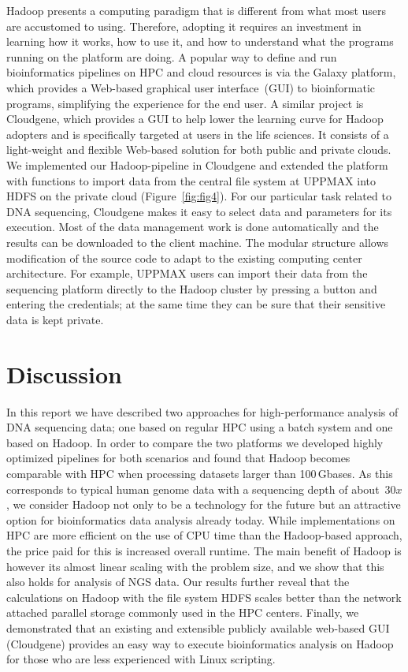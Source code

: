 \documentclass{bioinfo}
\begin{document}
Hadoop presents a computing paradigm that is different from what most users are
accustomed to using.  Therefore, adopting it requires an investment in learning
how it works, how to use it, and how to understand what the programs running on
the platform are doing.
A popular way to define and run bioinformatics pipelines on HPC and cloud resources
is via the Galaxy\citep{galaxy,Afgan:2010uq} platform, which provides a Web-based graphical
user interface~(GUI) to bioinformatic programs, simplifying the experience for
the end user.
A similar project is Cloudgene\citep{cloudgene}, which provides a GUI to help lower the learning curve
for Hadoop adopters and is specifically targeted at users in the life
sciences. It consists of a light-weight and flexible Web-based solution for both
public and private clouds. We implemented our Hadoop-pipeline in Cloudgene and
extended the platform with functions to import data from the central file system
at UPPMAX into HDFS on the private cloud (Figure~\ref{fig:fig4}).  For our
particular task related to DNA sequencing, Cloudgene makes it easy to select
data and parameters for its execution. Most of the data management work is done
automatically and the results can be downloaded to the client machine. The
modular structure allows modification of the source code to adapt to the
existing computing center architecture. For example, UPPMAX users can import
their data from the sequencing platform directly to the Hadoop cluster by
pressing a button and entering the credentials; at the same time they can be
sure that their sensitive data is kept private.


\section{Discussion}

In this report we have described two approaches for high-performance analysis of
DNA sequencing data; one based on regular HPC using a batch system and one based
on Hadoop. In order to compare the two platforms we developed highly optimized pipelines
for both scenarios and found that Hadoop becomes comparable with HPC when processing
datasets larger than 100\,Gbases. As this corresponds to typical human genome data with a sequencing depth of about~$30x$, we consider Hadoop not only to be a technology for the future but an attractive option for bioinformatics data analysis already today. While implementations on HPC are more efficient on the use of CPU time than the Hadoop-based approach, the price paid for this is increased overall runtime.
The main benefit of Hadoop is however its almost linear scaling with the problem size, and we show that this also holds for analysis of NGS data.
Our results further reveal that the calculations on Hadoop with the file system HDFS scales
better than the network attached parallel storage commonly used in the HPC centers.  
Finally, we demonstrated that an existing and extensible
publicly available web-based GUI (Cloudgene) provides an easy way to execute
bioinformatics analysis on Hadoop for those who are less experienced with Linux
scripting.
\end{document}
